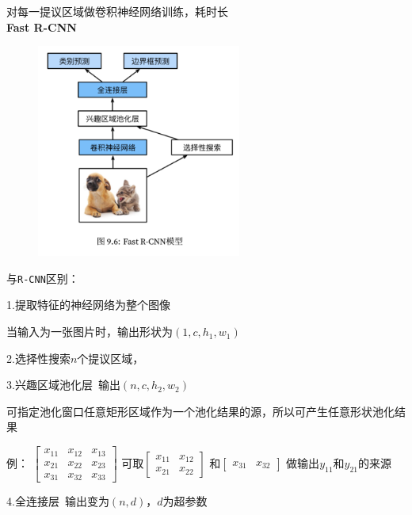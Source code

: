 \documentclass[UTF8]{ctexart}
\begin{document}
  对每一提议区域做卷积神经网络训练，耗时长\\
\textbf{Fast R-CNN}

  \begin{figure}[H] %
    \centering %
    \includegraphics[width=0.6\textwidth]{note_images/Fast_R-CNN.png} %
  \end{figure}

  与\texttt{R-CNN}区别：

  \quad 1.提取特征的神经网络为整个图像

  \quad \quad 当输入为一张图片时，输出形状为$(1, c, h_1, w_1)$

  \quad 2.选择性搜索$n$个提议区域，

  \quad 3.兴趣区域池化层\ 输出$(n, c, h_2, w_2)$

  \quad \quad 可指定池化窗口任意矩形区域作为一个池化结果的源，所以可产生任意形状池化结果

  \quad \quad 例：
    $\begin{bmatrix}
      x_{11} & x_{12} & x_{13} \\
      x_{21} & x_{22} & x_{23} \\
      x_{31} & x_{32} & x_{33}
      \end{bmatrix}$
    可取$\begin{bmatrix}
      x_{11} & x_{12} \\
      x_{21} & x_{22} 
      \end{bmatrix}$
    和$\begin{bmatrix}
      x_{31} & x_{32}
      \end{bmatrix}$
    做输出$y_{11}$和$y_{21}$的来源

  \quad 4.全连接层\ 输出变为$(n, d)$，$d$为超参数
\end{document}
